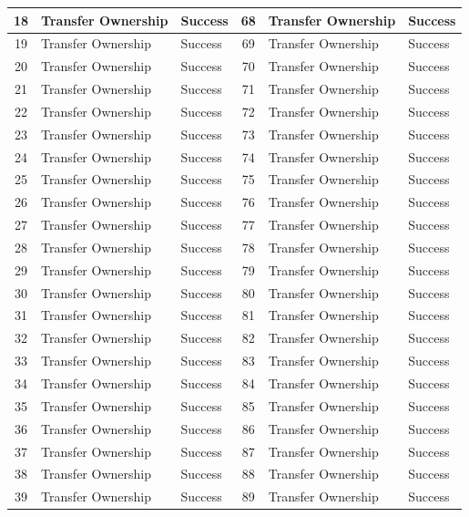 \begin{longtable}[c]{|c|l|l||c|l|l|}
  18 & Transfer Ownership & Success & 68 & Transfer Ownership & Success \\ \hline
  19 & Transfer Ownership & Success & 69 & Transfer Ownership & Success \\ \hline
  20 & Transfer Ownership & Success & 70 & Transfer Ownership & Success \\ \hline
  21 & Transfer Ownership & Success & 71 & Transfer Ownership & Success \\ \hline
  22 & Transfer Ownership & Success & 72 & Transfer Ownership & Success \\ \hline
  23 & Transfer Ownership & Success & 73 & Transfer Ownership & Success \\ \hline
  24 & Transfer Ownership & Success & 74 & Transfer Ownership & Success \\ \hline
  25 & Transfer Ownership & Success & 75 & Transfer Ownership & Success \\ \hline
  26 & Transfer Ownership & Success & 76 & Transfer Ownership & Success \\ \hline
  27 & Transfer Ownership & Success & 77 & Transfer Ownership & Success \\ \hline
  28 & Transfer Ownership & Success & 78 & Transfer Ownership & Success \\ \hline
  29 & Transfer Ownership & Success & 79 & Transfer Ownership & Success \\ \hline
  30 & Transfer Ownership & Success & 80 & Transfer Ownership & Success \\ \hline
  31 & Transfer Ownership & Success & 81 & Transfer Ownership & Success \\ \hline
  32 & Transfer Ownership & Success & 82 & Transfer Ownership & Success \\ \hline
  33 & Transfer Ownership & Success & 83 & Transfer Ownership & Success \\ \hline
  34 & Transfer Ownership & Success & 84 & Transfer Ownership & Success \\ \hline
  35 & Transfer Ownership & Success & 85 & Transfer Ownership & Success \\ \hline
  36 & Transfer Ownership & Success & 86 & Transfer Ownership & Success \\ \hline
  37 & Transfer Ownership & Success & 87 & Transfer Ownership & Success \\ \hline
  38 & Transfer Ownership & Success & 88 & Transfer Ownership & Success \\ \hline
  39 & Transfer Ownership & Success & 89 & Transfer Ownership & Success \\ \hline

\end{longtable}

